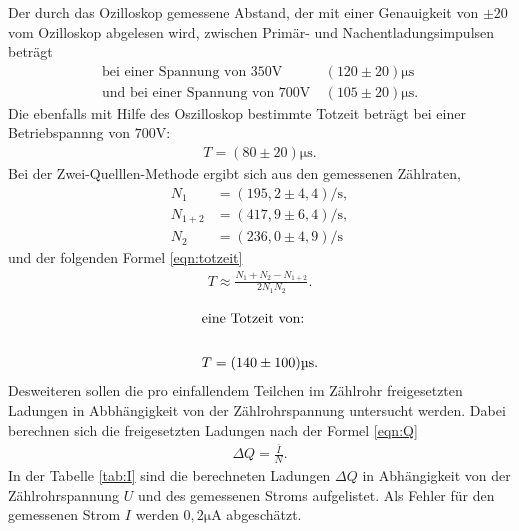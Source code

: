 Der durch das Ozilloskop gemessene Abstand, der mit einer
Genauigkeit von $\pm20$ vom Ozilloskop abgelesen wird, zwischen Primär- und
Nachentladungsimpulsen beträgt
\begin{align*}
\text{bei einer Spannung von $350\si{\volt}$} \ &(120\pm20)\si{\micro\second}\\
\text{und bei einer Spannung von $700\si{\volt}$} \ &(105\pm20)\si{\micro\second}.
\end{align*}
Die ebenfalls mit Hilfe des Oszilloskop bestimmte Totzeit beträgt
bei einer Betriebspannng von $700\si{\volt}$:
\begin{align*}
  T=(80\pm20)\si{\micro\second}.
\end{align*}
Bei der Zwei-Quelllen-Methode ergibt sich aus den gemessenen
Zählraten,
\begin{align*}
  N_1&= (195,2\pm4,4)\si{\per\second},\\
  N_{1+2}&=(417,9\pm6,4)\si{\per\second},\\
  N_2&=(236,0\pm4,9)\si{\per\second}
\end{align*}
und der folgenden Formel  \eqref{eqn:totzeit}
\begin{align}
T\approx\frac{N_1+N_2-N_{1+2}}{2N_1N_2}\label{eqn:totzeit}.\\
\end{align}
\begin{align*}
\intertext{eine Totzeit von:}\\
T=(140\pm100)\si{\micro\second}.
\end{align*}
Desweiteren sollen die pro einfallendem Teilchen im Zählrohr freigesetzten
Ladungen in Abbhängigkeit von der Zählrohrspannung untersucht werden.
Dabei berechnen sich die freigesetzten Ladungen nach der Formel \eqref{eqn:Q}
\begin{align}
  \Delta Q=\frac{\overline{I}}{N}.\label{eqn:Q}
\end{align}
In der Tabelle \ref{tab:I} sind die berechneten Ladungen $\Delta Q$ in Abhängigkeit
von der Zählrohrspannung $U$ und des gemessenen Stroms aufgelistet.
Als Fehler für den gemessenen Strom $I$ werden
$0,2\si{\micro\ampere}$ abgeschätzt.

